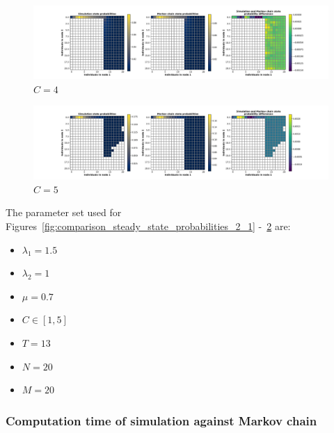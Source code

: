 \begin{figure}[H]
    \includegraphics[width=\textwidth, trim=100 10 100 10, clip]{chapters/03_queueing_model/img/numeric_results_and_timings/steady_state_probabilities_2/main_4.pdf}
    \caption{\(C = 4\)}
    \label{fig:comparison_steady_state_probabilities_2_4}
\end{figure}

\begin{figure}[H]
    \includegraphics[width=\textwidth, trim=100 10 100 10, clip]{chapters/03_queueing_model/img/numeric_results_and_timings/steady_state_probabilities_2/main_5.pdf}
    \caption{\(C = 5\)}
    \label{fig:comparison_steady_state_probabilities_2_5}
\end{figure}


The parameter set used for
Figures~\ref{fig:comparison_steady_state_probabilities_2_1}
-~\ref{fig:comparison_steady_state_probabilities_2_5} are:

\begin{itemize}
    \item \(\lambda_1 = 1.5\)
    \item \(\lambda_2 = 1\)
    \item \(\mu = 0.7\)
    \item \(C \in [1, 5]\)
    \item \(T = 13\)
    \item \(N = 20\)
    \item \(M = 20\)
\end{itemize}


\subsubsection{Computation time of simulation against Markov chain }

